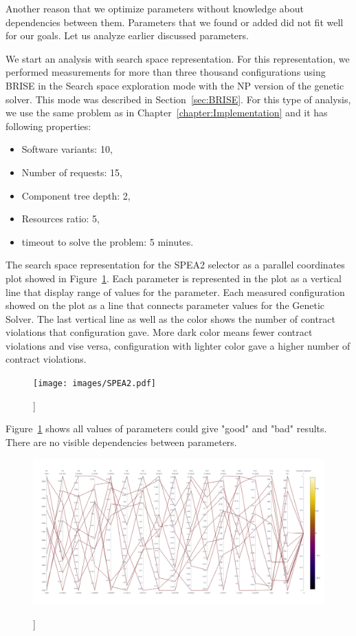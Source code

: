 Another reason that we optimize parameters without knowledge about dependencies between them. Parameters that we found or added did not fit well for our goals. Let us analyze earlier discussed parameters.

We start an analysis with search space representation. For this representation, we performed measurements for more than three thousand configurations using BRISE in the Search space exploration mode with the NP version of the genetic solver. This mode was described in Section~\ref{sec:BRISE}. For this type of analysis, we use the same problem as in Chapter~\ref{chapter:Implementation} and it has following properties:
\begin{itemize}
	\item Software variants: 10,
	\item Number of requests: 15,
	\item Component tree depth: 2,
	\item Resources ratio: 5,
	\item timeout to solve the problem: 5 minutes.
\end{itemize}

The search space representation for the SPEA2 selector as a parallel coordinates plot showed in Figure~\ref{fig:SearchSpaceViewFull}.
Each parameter is represented in the plot as a vertical line that display range of values for the parameter. Each measured configuration showed on the plot as a line that connects parameter values for the Genetic Solver. The last vertical line as well as the color shows the number of contract violations that configuration gave. More dark color means fewer contract violations and vise versa, configuration with lighter color gave a higher number of contract violations.

\begin{figure}
	\centering
	\texttt{[image: images/SPEA2.pdf]}
	\caption[]]{}
	\label{fig:SearchSpaceViewFull}
\end{figure}

Figure~\ref{fig:SearchSpaceViewFull} shows all values of parameters could give "good" and "bad" results. There are no visible dependencies between parameters. 

\begin{figure}
	\centering
	\includegraphics[width=\textwidth]{images/SPEA2_Zero_validity.html.pdf}
	\caption[]]{}
	\label{fig:SearchSpaceValid}
\end{figure}

